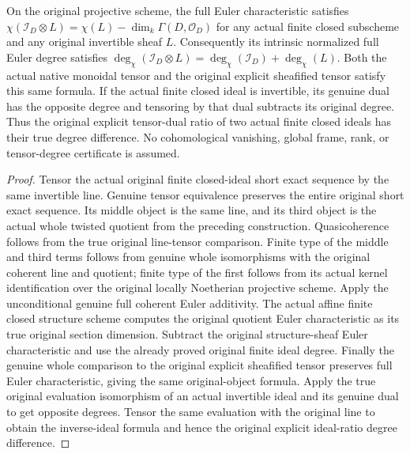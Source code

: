 \begin{theorem}
\label{thm:fc-finite-closed-line-euler}
\leanok
{}
On the original projective scheme, the full Euler characteristic satisfies
$\chi(\mathcal I_D\otimes L)=\chi(L)-\dim_k\Gamma(D,\mathcal O_D)$ for
any actual finite closed subscheme and any original invertible sheaf $L$.
Consequently its intrinsic normalized full Euler degree satisfies
$\deg_\chi(\mathcal I_D\otimes L)=\deg_\chi(\mathcal I_D)+\deg_\chi(L)$.
Both the actual native monoidal tensor and the original explicit sheafified
tensor satisfy this same formula. If the actual finite closed ideal is
invertible, its genuine dual has the opposite degree and tensoring by that
dual subtracts its original degree. Thus the original explicit tensor-dual
ratio of two actual finite closed ideals has their true degree difference.
No cohomological vanishing, global frame,
rank, or tensor-degree certificate is assumed.
\end{theorem}
\begin{proof}
Tensor the actual original finite closed-ideal short exact sequence by the
same invertible line. Genuine tensor equivalence preserves the entire
original short exact sequence. Its middle object is the same line, and its
third object is the actual whole twisted quotient from the preceding
construction. Quasicoherence follows from the true original line-tensor
comparison. Finite type of the middle and third terms follows from genuine
whole isomorphisms with the original coherent line and quotient; finite type
of the first follows from its actual kernel identification over the original
locally Noetherian projective scheme. Apply the unconditional genuine full
coherent Euler additivity. The actual affine finite closed structure scheme
computes the original quotient Euler characteristic as its true original
section dimension. Subtract the original structure-sheaf Euler characteristic
and use the already proved original finite ideal degree. Finally the genuine
whole comparison to the original explicit sheafified tensor preserves full
Euler characteristic, giving the same original-object formula. Apply the
true original evaluation isomorphism of an actual invertible ideal and its
genuine dual to get opposite degrees. Tensor the same evaluation with the
original line to obtain the inverse-ideal formula and hence the original
explicit ideal-ratio degree difference.
\end{proof}
